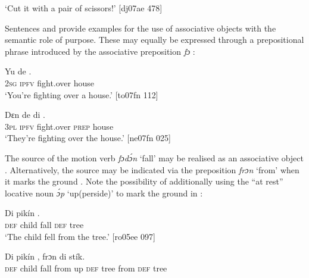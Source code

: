 \glt ‘Cut it with a pair of scissors!’ [dj07ae 478]
\z

Sentences  and  provide examples for the use of associative objects with the semantic role of purpose\index{}. These may equally be expressed through a prepositional phrase introduced by the associative preposition \textit{fɔ} : 


\ea%
    \label{ex:key:1181}
    \gll Yu  de      .\\
\textsc{2sg}  \textsc{ipfv}  fight.over  house\\

\glt ‘You’re fighting over a house.’ [to07fn 112]
\z


\ea%
    \label{ex:key:1182}
    \gll Dɛn  de       di  .\\
\textsc{3pl}  \textsc{ipfv}  fight.over  \textsc{prep}    house\\

\glt ‘They’re fighting over the house.’ [ne07fn 025]
\z

The source\is{} of the motion verb \textit{fɔdɔ́n} ‘fall’ may be realised as an associative object . Alternatively, the source may be indicated via the preposition \textit{frɔn} ‘from’ when it marks the ground . Note the possibility of additionally using the “at rest” locative noun \textit{ɔ́p} ‘up(perside)’ to mark the ground in :


\ea%
    \label{ex:key:1183}
    \gll Di  pikín      .\\
\textsc{def}  child  fall    \textsc{def}  tree\\

\glt ‘The child fell from the tree.’ [ro05ee 097]
\z


\ea%
    \label{ex:key:1184}
    \gll Di  pikín            ,    frɔn    di  stík.\\
\textsc{def}  child  fall    from  up  \textsc{def}  tree    from  \textsc{def}  tree\\

